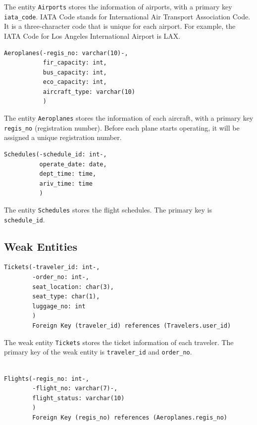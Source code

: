 \documentclass{article}
\begin{document}
	The entity \texttt{Airports} stores the information of airports, with a primary key \texttt{iata\_code}. IATA Code stands for International Air Transport Association Code. It is a three-character code that is unique for each airport. For example, the IATA Code for Los Angeles International Airport is LAX.
	
	\begin{lstlisting}[keepspaces=true]               
Aeroplanes(-regis_no: varchar(10)-,
           fir_capacity: int,
           bus_capacity: int, 
           eco_capacity: int,
           aircraft_type: varchar(10)
           )
	\end{lstlisting}    
	
	The entity \texttt{Aeroplanes} stores the information of each aircraft, with a primary key \texttt{regis\_no} (registration number). Before each plane starts operating, it will be assigned a unique registration number.
	
	\begin{lstlisting}[keepspaces=true] 
Schedules(-schedule_id: int-, 
          operate_date: date,
          dept_time: time,
          ariv_time: time
          )
	\end{lstlisting}
	
	The entity \texttt{Schedules} stores the flight schedules. The primary key is \texttt{schedule\_id}.
	
	\subsection{Weak Entities}
	
	\begin{lstlisting}[keepspaces=true]
Tickets(-traveler_id: int-, 
        -order_no: int-, 
        seat_location: char(3),
        seat_type: char(1),
        luggage_no: int
        )
        Foreign Key (traveler_id) references (Travelers.user_id)
	\end{lstlisting}    

	The weak entity \texttt{Tickets} stores the ticket information of each traveler. The primary key of the weak entity is \texttt{traveler\_id} and \texttt{order\_no}. 

	\begin{lstlisting}[keepspaces=true]        
		
Flights(-regis_no: int-, 
        -flight_no: varchar(7)-,
        flight_status: varchar(10)
        )
        Foreign Key (regis_no) references (Aeroplanes.regis_no)
	\end{lstlisting}
\end{document}
